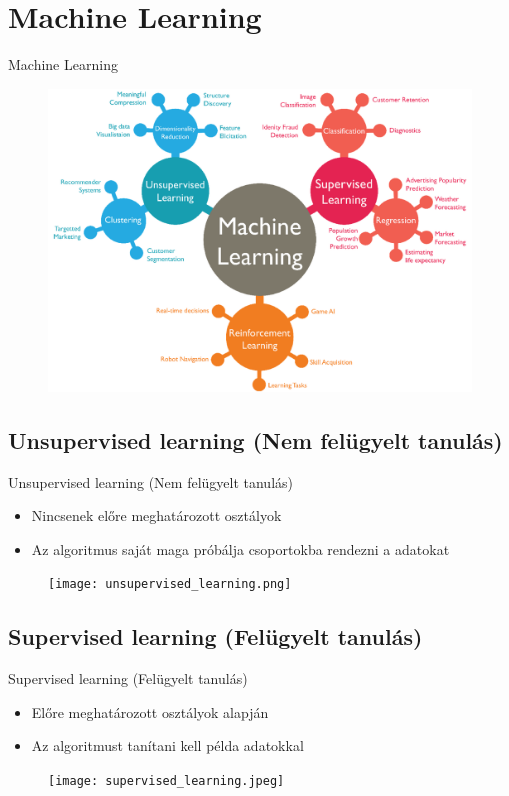 \documentclass{beamer}
\begin{document}
\section{Machine Learning}
\begin{frame}{Machine Learning}
    \centering
    \begin{figure}
        \includegraphics[scale=0.2]{machine_learning.png}    
    \end{figure}
\end{frame}
\subsection{Unsupervised learning (Nem felügyelt tanulás)}
\begin{frame}{Unsupervised learning (Nem felügyelt tanulás)}
    \begin{itemize}
        \item Nincsenek előre meghatározott osztályok
        \item Az algoritmus saját maga próbálja csoportokba rendezni a adatokat
    \end{itemize}
    \begin{figure}
        \texttt{[image: unsupervised\_learning.png]}
    \end{figure}
\end{frame}
\subsection{Supervised learning (Felügyelt tanulás)}
\begin{frame}{Supervised learning (Felügyelt tanulás)}
    \begin{itemize}
        \item Előre meghatározott osztályok alapján
        \item Az algoritmust tanítani kell példa adatokkal 
    \end{itemize}
    \begin{figure}
        \texttt{[image: supervised\_learning.jpeg]}
    \end{figure}
\end{frame}
\end{document}
